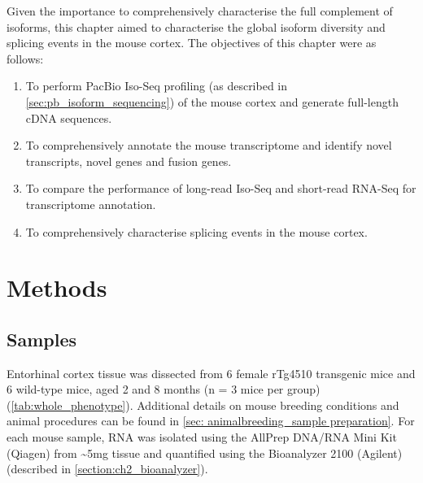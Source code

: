 \newpage
Given the importance to comprehensively characterise the full complement of isoforms, this chapter aimed to characterise the global isoform diversity and splicing events in the mouse cortex. The objectives of this chapter were as follows:
\begin{enumerate}
	\item To perform PacBio Iso-Seq profiling (as described in \cref{sec:pb_isoform_sequencing}) of the mouse cortex and generate full-length cDNA sequences. 
	\item To comprehensively annotate the mouse transcriptome and identify novel transcripts, novel genes and fusion genes.  
	\item To compare the performance of long-read Iso-Seq and short-read RNA-Seq for transcriptome annotation. 
	\item To comprehensively characterise splicing events in the mouse cortex.  	
\end{enumerate} 

\section{Methods}
\subsection{Samples}
Entorhinal cortex tissue was dissected from 6 female rTg4510 transgenic mice and 6 wild-type mice, aged 2 and 8 months (n = 3 mice per group) (\cref{tab:whole_phenotype}). Additional details on mouse breeding conditions and animal procedures can be found in \cref{sec: animalbreeding_sample preparation}. For each mouse sample, RNA was isolated using the AllPrep DNA/RNA Mini Kit (Qiagen) from \textasciitilde5mg tissue and quantified using the Bioanalyzer 2100 (Agilent) (described in \cref{section:ch2_bioanalyzer}). 

